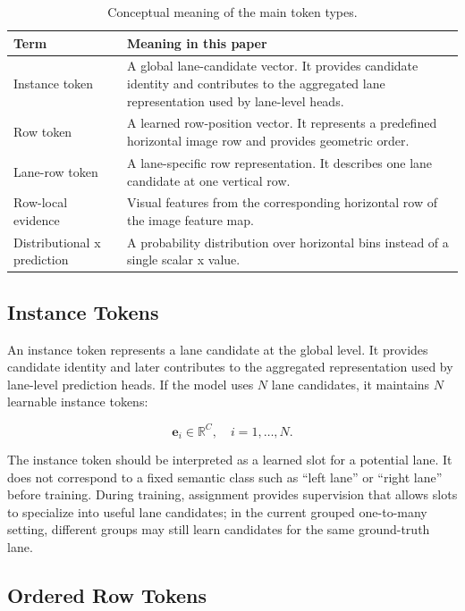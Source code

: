 \documentclass[conference]{IEEEtran}
\begin{document}
\begin{table}[t]
\centering
\caption{Conceptual meaning of the main token types.}
\label{tab:terms}
\begin{tabularx}{\linewidth}{lX}
\toprule
Term & Meaning in this paper \\
\midrule
Instance token & A global lane-candidate vector. It provides candidate identity and contributes to the aggregated lane representation used by lane-level heads. \\
Row token & A learned row-position vector. It represents a predefined horizontal image row and provides geometric order. \\
Lane-row token & A lane-specific row representation. It describes one lane candidate at one vertical row. \\
Row-local evidence & Visual features from the corresponding horizontal row of the image feature map. \\
Distributional x prediction & A probability distribution over horizontal bins instead of a single scalar x value. \\
\bottomrule
\end{tabularx}
\end{table}

\subsection{Instance Tokens}

An instance token represents a lane candidate at the global level. It provides candidate identity and later contributes to the aggregated representation used by lane-level prediction heads. If the model uses $N$ lane candidates, it maintains $N$ learnable instance tokens:

\begin{equation}
    \mathbf{e}_i \in \mathbb{R}^{C}, \quad i=1,\dots,N.
\end{equation}

The instance token should be interpreted as a learned slot for a potential lane. It does not correspond to a fixed semantic class such as ``left lane'' or ``right lane'' before training. During training, assignment provides supervision that allows slots to specialize into useful lane candidates; in the current grouped one-to-many setting, different groups may still learn candidates for the same ground-truth lane.

\subsection{Ordered Row Tokens}
\end{document}
